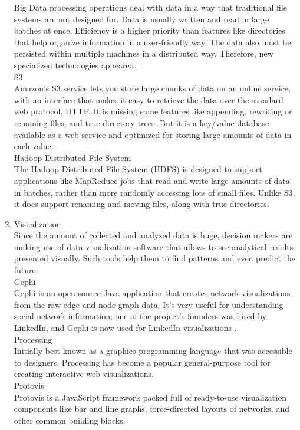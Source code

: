 \documentclass[runningheads]{llncs}
\begin{document}
\begin{enumerate}
Big Data processing operations deal with data in a way that traditional file systems are not designed for. Data is usually written and read in large batches at once. Efficiency is a higher priority than features like directories that help organize information in a user-friendly way. The data also must be persisted within multiple machines in a distributed way. Therefore, new specialized technologies appeared.\\

S3\\

Amazon's S3 service lets you store large chunks of data on an online service, with an interface that makes it easy to retrieve the data over the standard web protocol, HTTP. It is missing some features like appending, rewriting or renaming files, and true directory trees. But it is a key/value database available as a web service and optimized for storing large amounts of data in each value.\\

Hadoop Distributed File System\\

The Hadoop Distributed File System (HDFS) is designed to support applications like MapReduce jobs that read and write large amounts of data in batches, rather than more randomly accessing lots of small files. Unlike S3, it does support renaming and moving files, along with true directories.\\

\item Visualization\\

Since the amount of collected and analyzed data is huge, decision makers are making use of data visualization software that allows to see analytical results presented visually. Such tools help them to find patterns and even predict the future. \\

Gephi\\

Gephi is an open source Java application that creates network visualizations from the raw edge and node graph data. It's very useful for understanding social network information; one of the project's founders was hired by LinkedIn, and Gephi is now used for LinkedIn visualizations \cite{GLOSSARY}.\\ 

Processing\\

Initially best known as a graphics programming language that was accessible to designers,
Processing has become a popular general-purpose tool for creating interactive
web visualizations.\\

Protovis\\

Protovis is a JavaScript framework packed full of ready-to-use visualization components
like bar and line graphs, force-directed layouts of networks, and other common
building blocks.

\end{enumerate}
\end{document}
